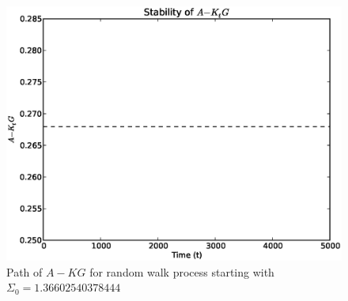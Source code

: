 \documentclass{homework}
\begin{document}
\begin{homeworkProblem}
{  }
      \begin{figure}[!h]
        \centering
        \includegraphics[width=5.5in]{./p2_20b.eps}
        \captionsetup{width=4in}
        \caption{\small Path of $A - KG$ for random walk process starting with $\Sigma_0 = 1.36602540378444$}
        \label{fig:p2_20b}
      \end{figure}
\end{homeworkProblem}
\end{document}
